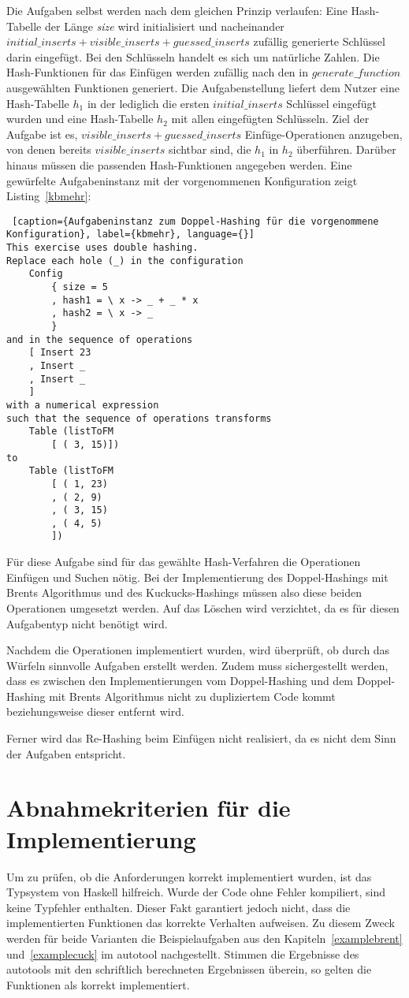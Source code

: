 Die Aufgaben selbst werden nach dem gleichen Prinzip verlaufen: Eine Hash-Tabelle der Länge \textit{size} wird initialisiert und nacheinander \(initial\_inserts+visible\_inserts+guessed\_inserts\) zufällig generierte Schlüssel darin eingefügt. Bei den Schlüsseln handelt es sich um natürliche Zahlen. Die Hash-Funktionen für das Einfügen werden zufällig nach den in \(generate\_function\) ausgewählten Funktionen generiert. Die Aufgabenstellung liefert dem Nutzer eine Hash-Tabelle \(h_{1}\) in der lediglich die ersten \(initial\_inserts\) Schlüssel eingefügt wurden und eine Hash-Tabelle \(h_{2}\) mit allen eingefügten Schlüsseln. Ziel der Aufgabe ist es, \(visible\_inserts+guessed\_inserts\) Einfüge-Operationen anzugeben, von denen bereits \(visible\_inserts\) sichtbar sind, die \(h_{1}\) in \(h_{2}\) überführen. Darüber hinaus müssen die passenden Hash-Funktionen angegeben werden. 
\newpage
Eine gewürfelte Aufgabeninstanz mit der vorgenommenen Konfiguration zeigt Listing~\ref{kbmehr}:
\begin{lstlisting} [caption={Aufgabeninstanz zum Doppel-Hashing für die vorgenommene Konfiguration}, label={kbmehr}, language={}]
This exercise uses double hashing.
Replace each hole (_) in the configuration
	Config
		{ size = 5
		, hash1 = \ x -> _ + _ * x
		, hash2 = \ x -> _ 
		}
and in the sequence of operations
	[ Insert 23
	, Insert _
	, Insert _
	]
with a numerical expression
such that the sequence of operations transforms
	Table (listToFM
		[ ( 3, 15)])
to
	Table (listToFM
		[ ( 1, 23)
		, ( 2, 9)
		, ( 3, 15)
		, ( 4, 5)
		])
\end{lstlisting}
Für diese Aufgabe sind für das gewählte Hash-Verfahren die Operationen Einfügen und Suchen nötig. Bei der Implementierung des Doppel-Hashings mit Brents Algorithmus und des Kuckucks-Hashings müssen also diese beiden Operationen umgesetzt werden. Auf das Löschen wird verzichtet, da es für diesen Aufgabentyp nicht benötigt wird. 

Nachdem die Operationen implementiert wurden, wird überprüft, ob durch das Würfeln sinnvolle Aufgaben erstellt werden. Zudem muss sichergestellt werden, dass es zwischen den Implementierungen vom Doppel-Hashing und dem Doppel-Hashing mit Brents Algorithmus nicht zu dupliziertem Code kommt beziehungsweise dieser entfernt wird. 

Ferner wird das Re-Hashing beim Einfügen nicht realisiert, da es nicht dem Sinn der Aufgaben entspricht.

\section{Abnahmekriterien für die Implementierung}\label{abnahme}
Um zu prüfen, ob die Anforderungen korrekt implementiert wurden, ist das Typsystem von Haskell hilfreich. Wurde der Code ohne Fehler kompiliert, sind keine Typfehler enthalten. Dieser Fakt garantiert jedoch nicht, dass die implementierten Funktionen das korrekte Verhalten aufweisen. Zu diesem Zweck werden für beide Varianten die Beispielaufgaben aus den Kapiteln~\ref{examplebrent} und~\ref{examplecuck} im autotool nachgestellt. Stimmen die Ergebnisse des autotools mit den schriftlich berechneten Ergebnissen überein, so gelten die Funktionen als korrekt implementiert. 

